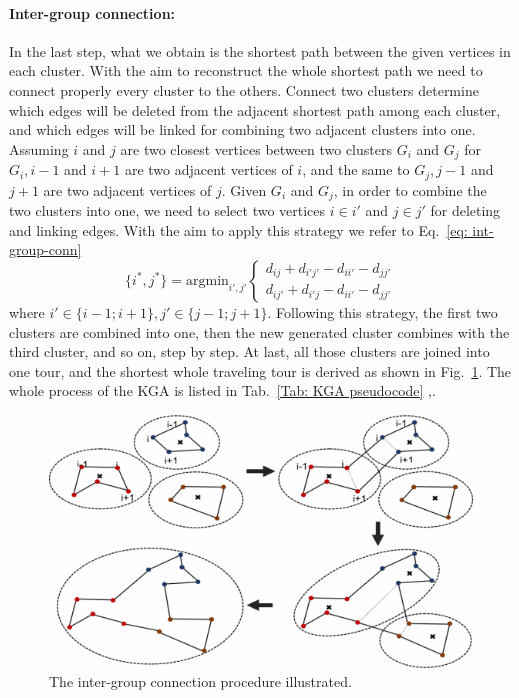 \documentclass[10pt]{article}
\begin{document}
\paragraph{Inter-group connection:}
In the last step, what we obtain is the shortest path between the given vertices in each cluster.
With the aim to reconstruct the whole shortest path we need to connect properly every cluster to the others.
Connect two clusters determine which edges will be deleted from the adjacent shortest path among each cluster, and which edges will be linked for combining two adjacent clusters into one. 
Assuming $i$ and $j$ are two closest vertices between two clusters $G_i$ and $G_j$ for $G_i,i−1$ and $i+1$ are two adjacent vertices of $i$, and the same to $G_j,j−1$ and $j+1$ are two adjacent vertices of $j$. 
Given $G_i$ and $G_j$, in order to combine the two clusters into one, we need to select two vertices $i \in i′$ and $j \in j'$ for deleting and linking edges.
With the aim to apply this strategy we refer to Eq.~\ref{eq: int-group-conn} 
\begin{equation}
\{i^*,j^*\} = \mathrm{arg min}_{i',j'} 
\begin{cases}
d_{ij} + d_{i'j'} - d_{ii'} - d_{jj'}\\d_{ij'} + d_{i'j} - d_{ii'} - d_{jj'}
\end{cases}
\label{eq: int-group-conn}
\end{equation}
where $i' \in \{i-1; i+1\}, j' \in \{j-1;j+1\}$.
Following this strategy, the first two clusters are combined into one, then the new generated cluster combines with the third cluster, and so on, step by step. At last, all those clusters are joined into one tour, and the shortest whole traveling tour is derived as shown in Fig.~\ref{fig:gconnect}.
The whole process of the KGA is listed in Tab.~\ref{Tab: KGA pseudocode} \cite{ventitre},\cite{ventiquattro}.
\begin{figure}
\centering \includegraphics[scale=0.9]{figs/inter_group_connection.png}
\caption{\label{fig:gconnect} The inter-group connection procedure illustrated.}
\end{figure}
\end{document}
